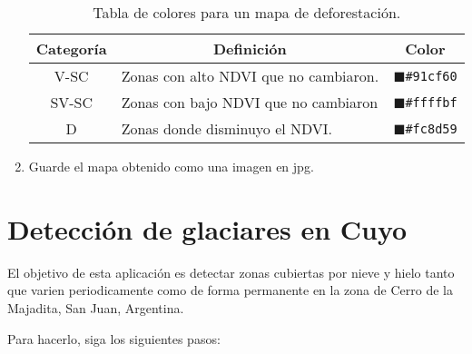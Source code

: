 \begin{enumerate}
\begin{table}[]
\centering
\begin{tabular}{@{}cll@{}}
\toprule
Categoría & \multicolumn{1}{c}{Definición}        & \multicolumn{1}{c}{Color}                       \\ \midrule
V-SC      & Zonas con alto NDVI que no cambiaron. & \textcolor{P1}{$\blacksquare$}\texttt{\#91cf60} \\
SV-SC     & Zonas con bajo NDVI que no cambiaron  & \textcolor{P2}{$\blacksquare$}\texttt{\#ffffbf} \\
D         & Zonas donde disminuyo el NDVI.        & \textcolor{P3}{$\blacksquare$}\texttt{\#fc8d59} \\ \bottomrule
\end{tabular}
\caption{Tabla de colores para un mapa de deforestación.}
\label{tab:def}
\end{table}

\item Guarde el mapa obtenido como una imagen en jpg.

\end{enumerate}

\section{Detección de glaciares en Cuyo}

El objetivo de esta aplicación es detectar zonas cubiertas por nieve y hielo tanto que varien periodicamente como de forma permanente en la zona de Cerro de la Majadita, San Juan, Argentina.

Para hacerlo, siga los siguientes pasos:

